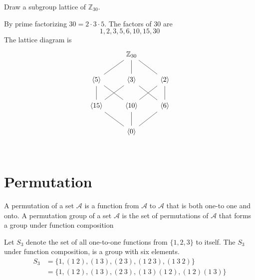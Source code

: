 \begin{example}
    Draw a subgroup lattice of $\mathbb{Z}_{30}$.
\end{example}
\begin{solution}
    By prime factorizing $30 = 2 \cdot 3 \cdot 5$. The factors of $30$ are
    \[
    1, 2, 3, 5, 6, 10, 15, 30
    \]
    The lattice diagram is 
    \[
        \begin{tikzcd}[row sep=2.0em]
            & \mathbb{Z}_{30} \arrow[dash]{dl} \arrow[dash]{d} \arrow[dash]{dr}& \\
            \langle 5 \rangle  \arrow[dash]{d}  \arrow[dash]{dr}& \langle 3 \rangle  \arrow[dash]{dl} \arrow[dash]{dr} & \langle 2 \rangle \arrow[dash]{dl} \arrow[dash]{d}\\
            \langle 15 \rangle  \arrow[dash]{dr} & \langle 10 \rangle  \arrow[dash]{d} & \langle 6 \rangle \arrow[dash]{dl}\\
            & \langle 0 \rangle & \\
        \end{tikzcd}
    \]
\end{solution}

\section{Permutation}

\begin{definition}
    A permutation of a set $\mathcal{A}$ is a function from $\mathcal{A}$ to $\mathcal{A}$ that is both one-to
one and onto. A permutation group of a set $\mathcal{A}$ is the set of permutations of $\mathcal{A}$ that 
forms a group under function composition
\end{definition}

\begin{example}
    Let $S_3$ denote the set of all one-to-one functions from $\{1, 2, 3\}$ to itself. The 
    $S_3$ under function composition, is a group with six elements.
    \begin{align*}
        S_3 &= \{ 1, (1\> 2), (1 \> 3), (2 \> 3), (1 \> 2 \> 3), (1 \> 3 \> 2) \} \\ 
        &= \{ 1, (1\> 2), (1 \> 3), (2 \> 3), (1 \> 3)(1 \> 2), (1 \> 2) (1 \> 3)\} \\
    \end{align*}
\end{example}

